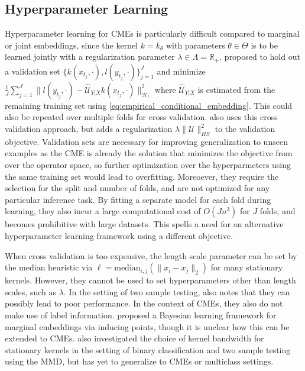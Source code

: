 \documentclass{llncs}
\begin{document}
	\subsection{Hyperparameter Learning}
	
	Hyperparameter learning for \glspl{CME} is particularly difficult compared to marginal or joint embeddings, since the kernel $k = k_{\theta}$ with parameters $\theta \in \Theta$ is to be learned jointly with a regularization parameter $\lambda \in \Lambda = \mathbb{R}_{+}$. \cite{lever2012conditional} proposed to hold out a validation set $\{k(x_{t_{j}}, \cdot), l(y_{t_{j}}, \cdot)\}_{j = 1}^{J}$ and minimize $\frac{1}{J} \sum_{j = 1}^{J} \big\| l(y_{t_{j}}, \cdot) - \hat{\mathcal{U}}_{Y | X} k(x_{t_{j}}, \cdot) \big\|_{\mathcal{H}_{l}}^{2}$ where $\hat{\mathcal{U}}_{Y | X}$ is estimated from the remaining training set using \eqref{eq:empirical_conditional_embedding}. This could also be repeated over multiple folds for cross validation. \cite[p. 15]{song2013kernel} also uses this cross validation approach, but adds a regularization $\lambda \| \mathcal{U} \|^{2}_{HS}$ to the validation objective. Validation sets are necessary for improving generalization to unseen examples as the \gls{CME} is already the solution that minimizes the objective from \cite{lever2012conditional} over the operator space, so further optimization over the hyperparmeters using the same training set would lead to overfitting. Moreoever, they require the selection for the split and number of folds, and are not optimized for any particular inference task. By fitting a separate model for each fold during learning, they also incur a large computational cost of $O(J n^{3})$ for $J$ folds, and becomes prohibitive with large datasets. This spells a need for an alternative hyperparameter learning framework using a different objective.
	
	When cross validation is too expensive, the length scale parameter can be set by the median heuristic \citep{muandet2016kernel} via $\ell = \mathrm{median}_{i, j}(\| x_{i} - x_{j} \|_{2})$ for many stationary kernels. However, they cannot be used to set hyperparameters other than length scales, such as $\lambda$. In the setting of two sample testing, \cite{gretton2012optimal} also notes that they can possibly lead to poor performance. In the context of \glspl{CME}, they also do not make use of label information. \cite{flaxman2016bayesian} proposed a Bayesian learning framework for marginal embeddings via inducing points, though it is unclear how this can be extended to \glspl{CME}. \cite{fukumizu2009kernel} also investigated the choice of kernel bandwidth for stationary kernels in the setting of binary classification and two sample testing using the \gls{MMD}, but has yet to generalize to \glspl{CME} or multiclass settings.
	
\end{document}

